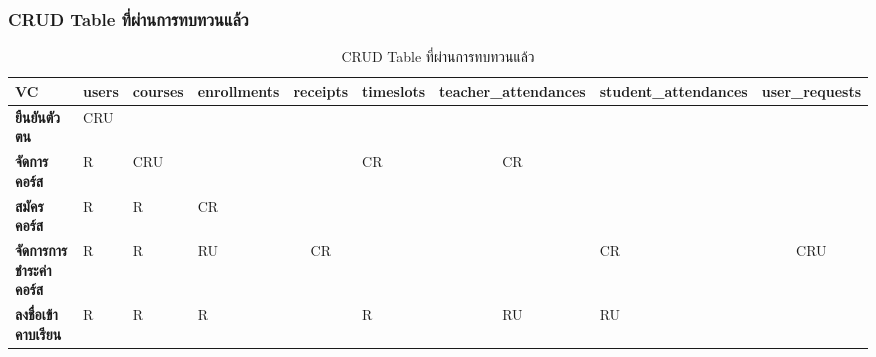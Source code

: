 \begin{landscape}
\subsubsection{CRUD Table ที่ผ่านการทบทวนแล้ว}

\begin{table}[H]
\caption{CRUD Table ที่ผ่านการทบทวนแล้ว}
\label{tab:crud-table-draft}
\begin{tabularx}{\textwidth}{|l|X|X|X|l|X|l|X|l|}
\hline
\multicolumn{1}{|X|}{\textbf{VC}} & \textbf{users} & \textbf{courses}      & \textbf{enrollments}  & \multicolumn{1}{c|}{\textbf{receipts}} & \textbf{timeslots}    & \multicolumn{1}{c|}{\textbf{teacher\_attendances}} & \textbf{student\_attendances} & \multicolumn{1}{c|}{\textbf{user\_requests}} \\ \hline
\textbf{ยืนยันตัวตน}              & CRU            & \multicolumn{1}{l|}{} & \multicolumn{1}{l|}{} &                                        & \multicolumn{1}{l|}{} &                                                    & \multicolumn{1}{l|}{}         &                                              \\ \hline
\textbf{จัดการคอร์ส}              & R              & CRU                   & \multicolumn{1}{l|}{} &                                        & CR                    & \multicolumn{1}{c|}{CR}                            & \multicolumn{1}{l|}{}         &                                              \\ \hline
\textbf{สมัครคอร์ส}               & R              & R                     & CR                    &                                        & \multicolumn{1}{l|}{} &                                                    & \multicolumn{1}{l|}{}         &                                              \\ \hline
\textbf{จัดการการชำระค่าคอร์ส}    & R              & R                     & RU                    & \multicolumn{1}{c|}{CR}                & \multicolumn{1}{l|}{} &                                                    & CR                            & \multicolumn{1}{c|}{CRU}                     \\ \hline
\textbf{ลงชื่อเข้าคาบเรียน}       & R              & R                     & R                     &                                        & R                     & \multicolumn{1}{c|}{RU}                            & RU                            &                                              \\ \hline

\end{tabularx}
\end{table}
\end{landscape}
